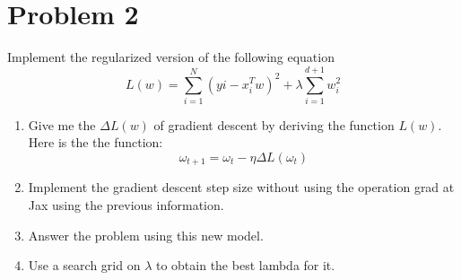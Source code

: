 \documentclass[conference, onecolumn]{IEEEtran}
\begin{document}
	\section*{Problem 2}
	Implement the regularized version of the following equation
	\begin{equation}
		L(w) = \sum_{i=1}^{N} (yi-x_i^Tw)^2 + \lambda\sum_{i=1}^{d+1} w_i^2
	\end{equation}
	\begin{enumerate}
		\item[(a)] Give me the $\Delta L(w)$ of gradient descent by deriving the function $L(w)$. Here is the the function:
		\begin{equation}
			\omega_{t+1} = \omega_t - \eta\Delta L(\omega_t)
		\end{equation}
		\item[(b)] Implement the gradient descent step size without using the operation grad at Jax using the previous information.
		\item[(c)] Answer the problem using this new model.
		\item[(d)] Use a search grid on $\lambda$ to obtain the best lambda for it.
	\end{enumerate}
	
\end{document}
